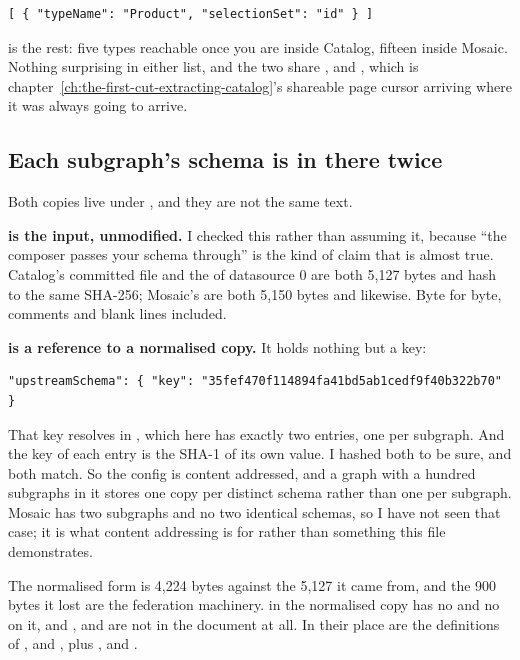 \begin{verbatim}
[ { "typeName": "Product", "selectionSet": "id" } ]
\end{verbatim}

 is the rest: five types reachable once you are inside Catalog,
fifteen inside Mosaic. Nothing surprising in either list, and the two share
,  and , which is
chapter~\ref{ch:the-first-cut-extracting-catalog}'s shareable page cursor
arriving where it was always going to arrive.

\subsection*{Each subgraph's schema is in there twice}

%
Both copies live under , and they are not the same text.

\medskip\noindent\textbf{ is the input, unmodified.}
I checked this rather than assuming it, because \enquote{the composer passes
your schema through} is the kind of claim that is almost true. Catalog's
committed file and the  of datasource 0 are both 5{,}127 bytes
and hash to the same SHA-256; Mosaic's are both 5{,}150 bytes and likewise. Byte
for byte, comments and blank lines included.

\medskip\noindent\textbf{ is a reference to a normalised
copy.} It holds nothing but a key:

\begin{verbatim}
"upstreamSchema": { "key": "35fef470f114894fa41bd5ab1cedf9f40b322b70" }
\end{verbatim}

%
That key resolves in , which here has exactly
two entries, one per subgraph. And the key of each entry is the SHA-1 of its own
value. I hashed both to be sure, and both match. So the config is content
addressed, and a graph with a hundred subgraphs in it stores one copy per
distinct schema rather than one per subgraph. Mosaic has two subgraphs and no
two identical schemas, so I have not seen that case; it is what content
addressing is for rather than something this file demonstrates.

The normalised form is 4{,}224 bytes against the 5{,}127 it came from, and the
900 bytes it lost are the federation machinery.  in the normalised
copy has no  and no  on it, and ,
 and  are not in the document at all. In their place
are the definitions of ,  and , plus
,  and .

